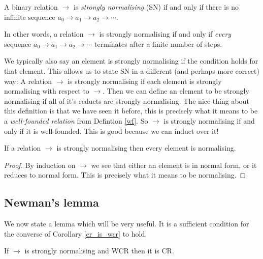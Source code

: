 \begin{defin}
    A binary relation $\to$ is \emph{strongly normalising} (SN) if and only if there is no infinite sequence $a_0 \to a_1 \to a_2 \to  \cdots$.
\end{defin}

\begin{remark}
    In other words, a relation $\to$ is strongly normalising if and only if \emph{every} sequence $a_0 \to a_1 \to a_2 \to  \cdots$ terminates after a finite number of steps.
\end{remark}

\begin{remark}
    We typically also say an element is strongly normalising if the condition holds for that element. This allows us to state SN in a different (and perhaps more correct) way: A relation $\to$ is strongly normalising if each element is strongly normalising with respect to $\to$. Then we can define an element to be strongly normalising if all of it's reducts are strongly normalising. The nice thing about this definition is that we have seen it before, this is precisely what it means to be a \emph{well-founded relation} from Defintion \ref{wf}. So $\to$ is strongly normalising if and only if it is well-founded. This is good because we can induct over it!
\end{remark}

\begin{cor}
    If a relation $\to$ is strongly normalising then every element is normalising.
\end{cor}

\begin{proof}
    By induction on $\to$ we see that either an element is in normal form, or it reduces to normal form. This is precisely what it means to be normalising.
\end{proof}

\subsection{Newman's lemma}

We now state a lemma which will be very useful. It is a sufficient condition for the converse of Corollary \ref{cr_is_wcr} to hold.

\begin{lemma}\label{newman}
    If $\to$ is strongly normalising and WCR then it is CR.
\end{lemma}

